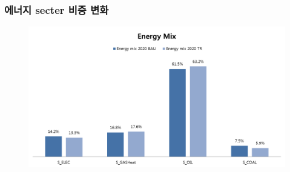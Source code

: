 \documentclass[10pt,compress,slidetop,%
			   hyperref={unicode},xcolor={svgnames},%
			   t]{beamer}
\begin{document}
\begin{frame}
	\frametitle{에너지 secter 비중 변화}
	\begin{figure}
		\centering
		\includegraphics[width=1.00\textwidth]{Emix.png}
	\end{figure}
\end{frame}
\end{document}
